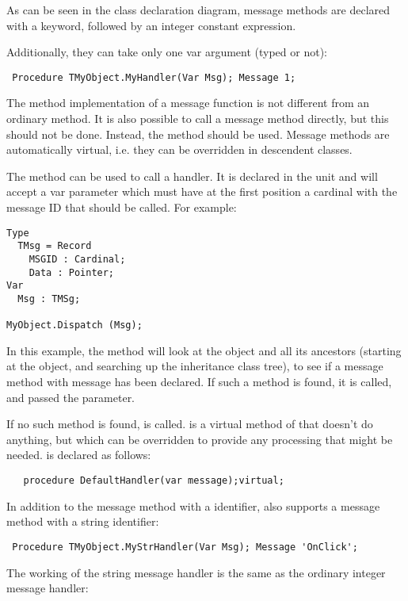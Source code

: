 As can be seen in the class declaration diagram, message methods are 
declared with a  keyword, followed by an integer constant
expression. 

Additionally, they can take only one var argument (typed or not):
\begin{verbatim}
 Procedure TMyObject.MyHandler(Var Msg); Message 1;
\end{verbatim}
The method implementation of a message function is not different from an
ordinary method. It is also possible to call a message method directly,
but this should not be done. Instead, the  method
should be used. Message methods are automatically virtual,
i.e. they can be overridden in descendent classes.

The  method can be used to call a
handler. It is declared in the  unit and will accept a var
parameter  which must have at the first position a cardinal with the
message ID that should be called. For example:
\begin{verbatim}
Type
  TMsg = Record
    MSGID : Cardinal;
    Data : Pointer;
Var
  Msg : TMSg;

MyObject.Dispatch (Msg);
\end{verbatim}
In this example, the  method will look at the object and all
its ancestors (starting at the object, and searching up the inheritance 
class tree), to see if a message method with message  has been
declared. If such a method is found, it is called, and passed the
 parameter.

If no such method is found,  is called.
 is a virtual method of  that doesn't do
anything, but which can be overridden to provide any processing that might be
needed.  is declared as follows:
\begin{verbatim}
   procedure DefaultHandler(var message);virtual;
\end{verbatim}

In addition to the message method with a  identifier,
\fpc also supports a message method with a string identifier:
\begin{verbatim}
 Procedure TMyObject.MyStrHandler(Var Msg); Message 'OnClick';
\end{verbatim}
The working of the string message handler is the same as the ordinary
integer message handler:

